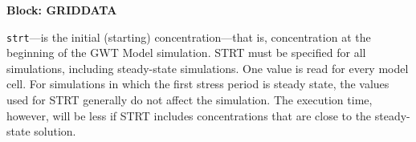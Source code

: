 
\item \textbf{Block: GRIDDATA}

\begin{description}
\item \texttt{strt}---is the initial (starting) concentration---that is, concentration at the beginning of the GWT Model simulation.  STRT must be specified for all simulations, including steady-state simulations. One value is read for every model cell. For simulations in which the first stress period is steady state, the values used for STRT generally do not affect the simulation. The execution time, however, will be less if STRT includes concentrations that are close to the steady-state solution.

\end{description}

